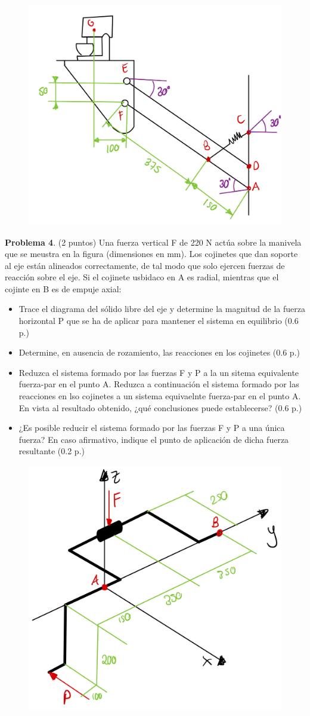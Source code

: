 \documentclass[10pt]{article}
\begin{document}
\begin{figure}[h!]
    \centering
  \includegraphics[width=0.35\linewidth]{problema_3.jpeg}
  \label{fig:}
\end{figure}

\textbf{Problema 4}. (2 puntos) Una fuerza vertical F de 220 N actúa sobre la manivela que se meustra en la figura (dimensiones en mm). Los cojinetes que dan soporte al eje están alineados correctamente, de tal modo que solo ejercen fuerzas de reacción sobre el eje. Si el cojinete usbidaco en A es radial, mientras que el cojinte en B es de empuje axial:
\begin{itemize}
    \item Trace el diagrama del sólido libre del eje y determine la magnitud de la fuerza horizontal P que se ha de aplicar para mantener el sistema en equilibrio (0.6 p.)
    \item Determine, en ausencia de rozamiento, las reacciones en los cojinetes (0.6 p.)
    \item Reduzca el sistema formado por las fuerzas F y P a la un sitema equivalente fuerza-par en el punto A. Reduzca a continuación el sistema formado por las reacciones en lso cojinetes a un sistema equivaelnte fuerza-par en el punto A. En vista al resultado obtenido, ¿qué conclusiones puede establecerse? (0.6 p.)
    \item ¿Es posible reducir el sistema formado por las fuerzas F y P a una única fuerza? En caso afirmativo, indique el punto de aplicación de dicha fuerza resultante (0.2 p.)
\end{itemize}
\begin{figure}[h!]
  \centering
  \includegraphics[width=0.35\linewidth]{problema_4.jpeg}
  \label{fig:}
\end{figure}
\end{document}
